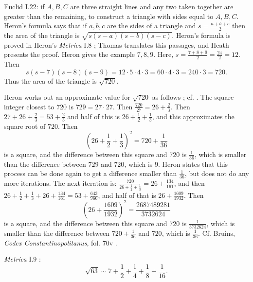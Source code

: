 \documentclass{amsart}
\theoremstyle{definition}
\begin{document}
Euclid I.22: if $A,B,C$ are three straight lines and any two taken together are greater
than the remaining, to construct a triangle with sides equal to $A,B,C$. 
Heron's formula says that if $a,b,c$ are the sides of a triangle and 
$s=\frac{a+b+c}{2}$ then the area of the triangle is 
$\sqrt{s(s-a)(s-b)(s-c)}$. Heron's formula is proved in 
Heron's {\em Metrica} I.8 \cite[pp.~18--25]{heronisIII};
Thomas \cite[pp.~470--477]{thomasII} translates this passages, and
Heath \cite[pp.~321--323]{HGMII} presents the proof. Heron gives the example
$7,8,9$. Here, $s=\frac{7+8+9}{2}=\frac{24}{2}=12$. Then
\[
s(s-7)(s-8)(s-9) = 12 \cdot 5 \cdot 4 \cdot 3 = 60 \cdot 4 \cdot 3 = 240 \cdot 3 = 720.
\]
Thus the area of the triangle is $\sqrt{720}$. 

Heron works out an approximate value for $\sqrt{720}$ as follows \cite[pp.~323--326]{HGMII}; cf. \cite{metrica}. The square integer closest to $720$ is $729=27 \cdot 27$. 
Then $\frac{720}{27}=26+\frac{2}{3}$. Then
$27+26+\frac{2}{3}=53+\frac{2}{3}$ and half of this is $26+\frac{1}{2}+\frac{1}{3}$, and this approximates
the square root of $720$. Then
\[
\left( 26+\frac{1}{2}+\frac{1}{3} \right)^2 = 720+\frac{1}{36}
\]
 is a square, and the difference between this square and $720$
is $\frac{1}{36}$, which is smaller than the difference between $729$ and $720$, which is $9$. 
Heron states that this process can be done again to get a difference smaller than $\frac{1}{36}$, but does not do any more iterations.
The next iteration is: $\frac{720}{26+\frac{1}{2}+\frac{1}{3}} =26+\frac{134}{161}$, and then
$26+\frac{1}{2}+\frac{1}{3}+26+\frac{134}{161}=53+\frac{643}{966}$, and half of that is
$26+\frac{1609}{1932}$. Then
\[
\left(26+\frac{1609}{1932}\right)^2 =\frac{2687489281}{3732624}
\]
is a square, and the difference between this square and $720$ is $\frac{1}{3732624}$, which is smaller than the difference
between $720+\frac{1}{36}$ and $720$, which is $\frac{1}{36}$. Cf. 
Bruins, {\em Codex Constantinopolitanus}, fol. 70v \cite[p.~189]{constantinopolitanus}.


{\em Metrica} I.9 \cite[pp.~27--29]{heronisIII}:
\[
\sqrt{63} \sim 7+\frac{1}{2}+\frac{1}{4}+\frac{1}{8}+\frac{1}{16}.
\]
\end{document}
